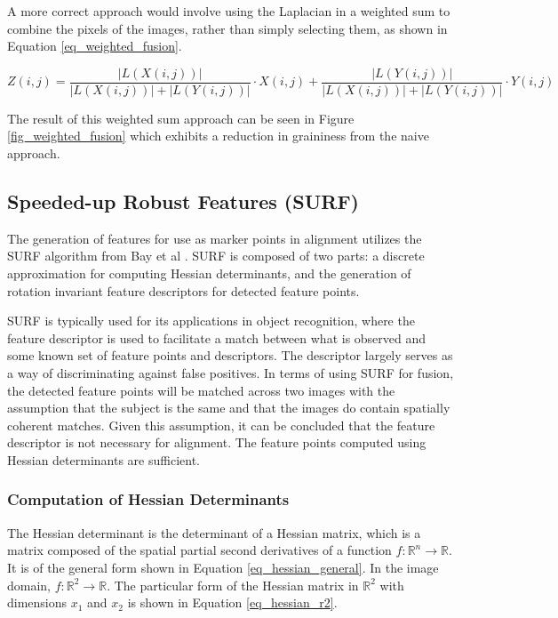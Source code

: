 \documentclass[sigconf]{acmart/acmart}
\begin{document}
A more correct approach would involve using the Laplacian in a weighted sum to combine the pixels of the images, rather than simply selecting them, as shown in Equation \ref{eq_weighted_fusion}.

\begin{equation}
Z(i,j) = \frac{|L(X(i,j))|}{|L(X(i,j))| + |L(Y(i,j))|} \cdot X(i,j) + \frac{|L(Y(i,j))|}{|L(X(i,j))| + |L(Y(i,j))|} \cdot Y(i,j)
\label{eq_weighted_fusion}
\end{equation}

The result of this weighted sum approach can be seen in Figure \ref{fig_weighted_fusion} which exhibits a reduction in graininess from the naive approach.

\subsection{Speeded-up Robust Features (SURF)}

The generation of features for use as marker points in alignment utilizes the SURF algorithm from Bay et al \cite{bay_surf:_2006}. SURF is composed of two parts: a discrete approximation for computing Hessian determinants, and the generation of rotation invariant feature descriptors for detected feature points. 

SURF is typically used for its applications in object recognition, where the feature descriptor is used to facilitate a match between what is observed and some known set of feature points and descriptors. The descriptor largely serves as a way of discriminating against false positives. In terms of using SURF for fusion, the detected feature points will be matched across two images with the assumption that the subject is the same and that the images do contain spatially coherent matches. Given this assumption, it can be concluded that the feature descriptor is not necessary for alignment. The feature points computed using Hessian determinants are sufficient.

\subsubsection{Computation of Hessian Determinants}

The Hessian determinant is the determinant of a Hessian matrix, which is a matrix composed of the spatial partial second derivatives of a function $f : \mathbb{R}^n \rightarrow \mathbb{R}$. It is of the general form shown in Equation \ref{eq_hessian_general}. In the image domain, $f : \mathbb{R}^2 \rightarrow \mathbb{R}$. The particular form of the Hessian matrix in $\mathbb{R}^2$ with dimensions $x_1$ and $x_2$ is shown in Equation \ref{eq_hessian_r2}.
\end{document}
